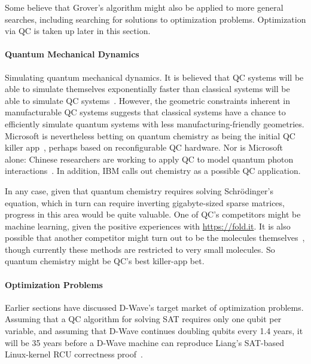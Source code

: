 Some believe that Grover's algorithm might also be applied to more general
searches, including searching for solutions to optimization problems.
Optimization via QC is taken up later in this section.

\paragraph{Quantum Mechanical Dynamics}
\label{sec:future:Quantum Mechanical Dynamics}

Simulating quantum mechanical dynamics.
It is believed that QC systems will be able to simulate themselves
exponentially faster than classical systems will be able to
simulate QC systems~\cite{Feynman1982}.
However, the geometric constraints inherent in manufacturable
QC systems suggests that classical systems have a chance
to efficiently simulate quantum systems with less
manufacturing-friendly geometries.
Microsoft is nevertheless betting on quantum chemistry as being
the initial QC killer app~\cite{TomSimonite2017QC-MS-Chemistry},
perhaps based on reconfigurable QC hardware.
Nor is Microsoft alone: Chinese researchers are working to apply
QC to model quantum photon interactions~\cite{StephenChen2017ChinaQC}.
In addition, IBM calls out chemistry as a possible QC application.

In any case, given that quantum chemistry requires solving
Schr\"{o}dinger's equation, which in turn can require inverting
gigabyte-sized sparse matrices, progress in this area would
be quite valuable.
One of QC's competitors might be machine learning, given the positive
experiences with \url{https://fold.it}.
It is also possible that another competitor might turn out to be the
molecules themselves~\cite{Chin-wenChou2017ManipulateMolecule}, though
currently these methods are restricted to very small molecules.
So quantum chemistry might be QC's best killer-app bet.

\paragraph{Optimization Problems}
\label{sec:future:Optimization Problems}

Earlier sections have discussed D-Wave's target market of optimization
problems.
Assuming that a QC algorithm for solving SAT requires only one qubit
per variable, and assuming that D-Wave continues doubling qubits every
1.4 years, it will be 35 years before a D-Wave machine can reproduce
Liang's SAT-based Linux-kernel RCU correctness
proof~\cite{LihaoLiang2016VerifyTreeRCU}.

